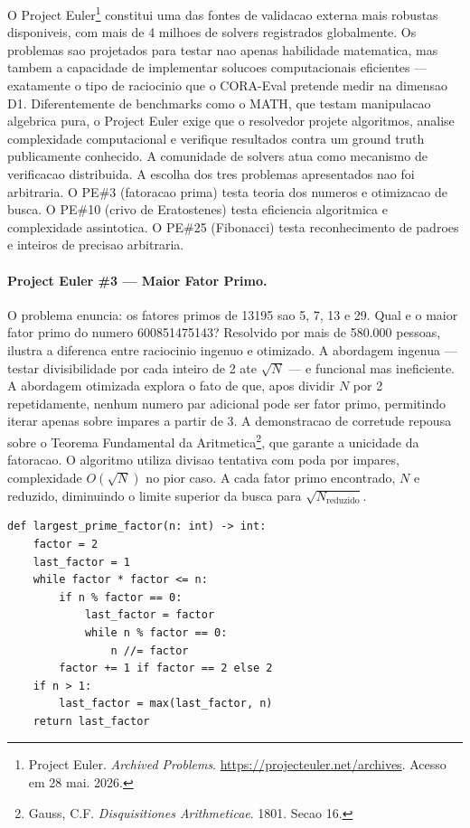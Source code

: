O Project Euler\footnote{Project Euler. \textit{Archived Problems}.
\url{https://projecteuler.net/archives}. Acesso em 28 mai. 2026.}
constitui uma das fontes de validacao externa mais robustas disponiveis,
com mais de 4 milhoes de solvers registrados globalmente. Os problemas
sao projetados para testar nao apenas habilidade matematica, mas tambem
a capacidade de implementar solucoes computacionais eficientes ---
exatamente o tipo de raciocinio que o CORA-Eval pretende medir na
dimensao D1. Diferentemente de benchmarks como o MATH, que testam
manipulacao algebrica pura, o Project Euler exige que o resolvedor
projete algoritmos, analise complexidade computacional e verifique
resultados contra um ground truth publicamente conhecido. A comunidade
de solvers atua como mecanismo de verificacao distribuida.
A escolha dos tres problemas apresentados nao foi arbitraria.
O PE\#3 (fatoracao prima) testa teoria dos numeros e otimizacao de
busca. O PE\#10 (crivo de Eratostenes) testa eficiencia algoritmica
e complexidade assintotica. O PE\#25 (Fibonacci) testa reconhecimento
de padroes e inteiros de precisao arbitraria.

\paragraph{Project Euler \#3 --- Maior Fator Primo.}

O problema enuncia: os fatores primos de 13195 sao 5, 7, 13 e 29. Qual
e o maior fator primo do numero 600851475143? Resolvido por mais de
580.000 pessoas, ilustra a diferenca entre raciocinio ingenuo e
otimizado. A abordagem ingenua --- testar divisibilidade por cada inteiro
de 2 ate $\sqrt{N}$ --- e funcional mas ineficiente. A abordagem otimizada
explora o fato de que, apos dividir $N$ por 2 repetidamente, nenhum numero
par adicional pode ser fator primo, permitindo iterar apenas sobre impares
a partir de 3. A demonstracao de corretude repousa sobre o Teorema
Fundamental da Aritmetica\footnote{Gauss, C.F. \textit{Disquisitiones
Arithmeticae}. 1801. Secao 16.}, que garante a unicidade da fatoracao.
O algoritmo utiliza divisao tentativa com poda por impares, complexidade
$O(\sqrt{N})$ no pior caso. A cada fator primo encontrado, $N$ e reduzido,
diminuindo o limite superior da busca para $\sqrt{N_{\text{reduzido}}}$.

\begin{verbatim}
def largest_prime_factor(n: int) -> int:
    factor = 2
    last_factor = 1
    while factor * factor <= n:
        if n % factor == 0:
            last_factor = factor
            while n % factor == 0:
                n //= factor
        factor += 1 if factor == 2 else 2
    if n > 1:
        last_factor = max(last_factor, n)
    return last_factor
\end{verbatim}

